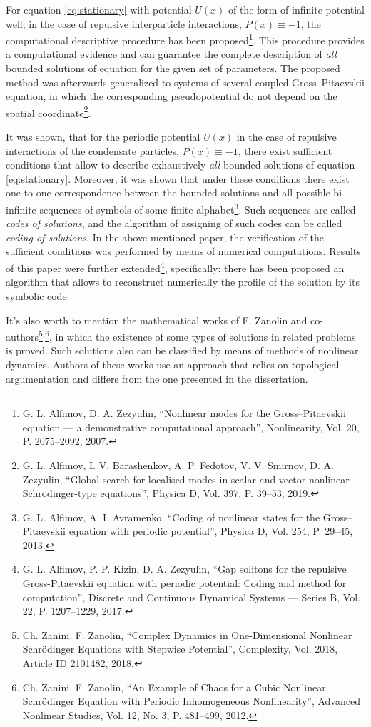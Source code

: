 \documentclass[candidate, href, colorlinks]{disser}
\begin{document}
For equation \eqref{eq:stationary} with potential $U(x)$ of the form of infinite potential well, in the case of repulsive interparticle interactions, $P(x) \equiv -1$, the computational descriptive procedure has been proposed\footnote{\label{note:alfzez} G. L. Alfimov, D. A. Zezyulin, ``Nonlinear modes for the Gross--Pitaevskii equation --- a demonstrative computational approach'', Nonlinearity, Vol. 20, P. 2075--2092, 2007.}.
This procedure provides a computational evidence and can guarantee the complete description of {\it all} bounded solutions of equation for the given set of parameters.
The proposed method was afterwards generalized to systems of several coupled Gross--Pitaevskii equation, in which the corresponding pseudopotential do not depend on the spatial coordinate\footnote{G. L. Alfimov, I. V. Barashenkov, A. P. Fedotov, V. V. Smirnov, D. A. Zezyulin, ``Global search for localised modes in scalar and vector nonlinear Schr{\"o}dinger-type equations'', Physica D, Vol. 397, P. 39--53, 2019.}.

It was shown, that for the periodic potential $U(x)$ in the case of repulsive interactions of the condensate particles, $P(x) \equiv -1$, there exist sufficient conditions that allow to describe exhaustively {\it all} bounded solutions of equation \eqref{eq:stationary}.
Moreover, it was shown that under these conditions there exist one-to-one correspondence between the bounded solutions and all possible bi-infinite sequences of symbols of some finite alphabet\footnote{\label{note:alfavr} G. L. Alfimov, A. I. Avramenko, ``Coding of nonlinear states for the Gross--Pitaevskii equation with periodic potential'', Physica D, Vol. 254, P. 29--45, 2013.}.
Such sequences are called {\it codes of solutions}, and the algorithm of assigning of such codes can be called {\it coding of solutions}.
In the above mentioned paper, the verification of the sufficient conditions was performed by means of numerical computations.
Results of this paper were further extended\footnote{G. L. Alfimov, P. P. Kizin, D. A. Zezyulin, ``Gap solitons for the repulsive Gross-Pitaevskii equation with periodic potential: Coding and method for computation'', Discrete and Continuous Dynamical Systems --- Series B, Vol. 22, P. 1207--1229, 2017.}, specifically: there has been proposed an algorithm that allows to reconstruct numerically the profile of the solution by its symbolic code.

It's also worth to mention the mathematical works of F. Zanolin and co-authors\footnote{Ch. Zanini, F. Zanolin, ``Complex Dynamics in One-Dimensional Nonlinear Schr\"odinger Equations with Stepwise Potential'', Complexity, Vol. 2018, Article ID 2101482, 2018.}\textsuperscript{,}\footnote{Ch. Zanini, F. Zanolin, ``An Example of Chaos for a Cubic Nonlinear Schr\"odinger Equation with Periodic Inhomogeneous Nonlinearity'', Advanced Nonlinear Studies, Vol. 12, No. 3, P. 481--499, 2012.}, in which the existence of some types of solutions in related problems is proved.
Such solutions also can be classified by means of methods of nonlinear dynamics.
Authors of these works use an approach that relies on topological argumentation and differs from the one presented in the dissertation.
\end{document}
